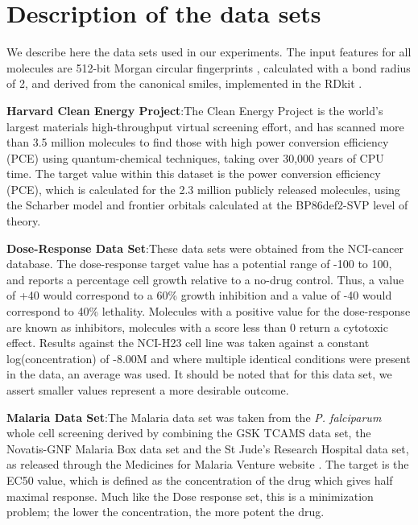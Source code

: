 \section{Description of the data sets}

We describe here the data sets used in our experiments. The input features for all molecules are 512-bit Morgan circular fingerprints \cite{Rogers_2010}, calculated with a bond radius of 2, and derived from the canonical smiles, implemented in the RDkit \cite{rdkit}.

\textbf{Harvard Clean Energy Project}:The Clean Energy Project is the world's largest materials high-throughput virtual screening effort\cite{hachmann_lead_2014,hachmann_harvard_2011}, and has scanned more than 3.5 million molecules to find those with high power conversion efficiency (PCE) using quantum-chemical techniques, taking over 30,000 years of CPU time. The target value within this dataset is the power conversion efficiency (PCE), which is calculated for the 2.3 million publicly released molecules, using the Scharber model\cite{scharber_design_2006} and frontier orbitals calculated at the BP86\cite{perdew_density-functional_1986,becke_densityfunctional_1993}\/def2-SVP\cite{weigend_balanced_2005} level of theory.


\textbf{Dose-Response Data Set}:These data sets were obtained from the NCI-cancer database\cite{_nci_}.  The dose-response target value has a potential range of -100 to 100, and reports a percentage cell growth relative to a no-drug control.  Thus, a value of +40 would correspond to a 60\% growth inhibition and a value of -40 would correspond to 40\% lethality.  Molecules with a positive value for the dose-response are known as inhibitors, molecules with a score less than 0 return a cytotoxic effect. Results against the NCI-H23 cell line was taken against a constant log(concentration) of -8.00M and where multiple identical conditions were present in the data, an average was used.  It should be noted that for this data set, we assert smaller values represent a more desirable outcome. 


\textbf{Malaria Data Set}:The Malaria data set was taken from the \textit{P. falciparum} whole cell screening derived by combining the GSK TCAMS data set, the Novatis-GNF Malaria Box data set and the St Jude's Research Hospital data set, as released through the Medicines for Malaria Venture website \cite{23798988}.  The target is the EC50 value, which is defined as the concentration of the drug which gives half maximal response.  Much like the Dose response set, this is a minimization problem; the lower the concentration, the more potent the drug.
